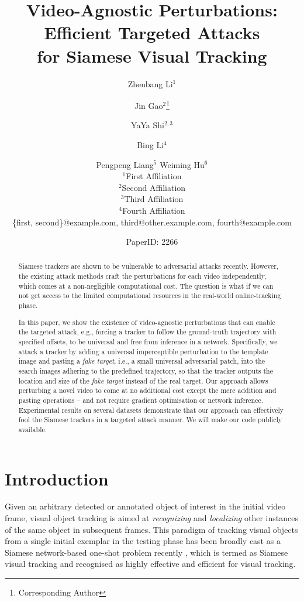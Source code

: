 \documentclass{article}
\title{Video-Agnostic Perturbations: Efficient Targeted Attacks \\ for Siamese Visual Tracking}
\author{
Zhenbang Li$^1$\and
Jin Gao$^2$\footnote{Corresponding Author}\and
YaYa Shi$^{2,3}$\and
Bing Li$^4$\and
Pengpeng Liang$^5$\And
Weiming Hu$^6$\\
\affiliations
$^1$First Affiliation\\
$^2$Second Affiliation\\
$^3$Third Affiliation\\
$^4$Fourth Affiliation\\
\emails
\{first, second\}@example.com,
third@other.example.com,
fourth@example.com
}
\author{PaperID: 2266}
\begin{document}
\maketitle

\begin{abstract}

Siamese trackers are shown to be vulnerable to adversarial attacks recently. However, the existing attack methods craft the perturbations for each video independently, which comes at a non-negligible computational cost. The question is what if we can not get access to the limited computational resources in the real-world online-tracking phase.

In this paper, we show the existence of video-agnostic perturbations that can enable the targeted attack, e.g., forcing a tracker to follow the ground-truth trajectory with specified offsets, to be universal and free from inference in a network. Specifically, we attack a tracker by adding a universal imperceptible perturbation to the template image and pasting a \textit{fake target}, i.e., a small universal adversarial patch, into the search images adhering to the predefined trajectory, so that the tracker outputs the location and size of the \textit{fake target} instead of the real target. Our approach allows perturbing a novel video to come at no additional cost except the mere addition and pasting operations -- and not require gradient optimisation or network inference. Experimental results on several datasets demonstrate that our approach can effectively fool the Siamese trackers in a targeted attack manner. We will make our code publicly available.

\end{abstract}

\section{Introduction}

Given an arbitrary detected or annotated object of interest in the initial video frame, visual object tracking is aimed at {\it recognizing} and {\it localizing} other instances of the same object in subsequent frames. This paradigm of tracking visual objects from a single initial exemplar in the testing phase has been broadly cast as a Siamese network-based one-shot problem recently \cite{SiamFC,SiamRPN,DaSiamRPN,SiamRPN++,SiamMask,SiamFC++}, which is termed as Siamese visual tracking and recognised as highly effective and efficient for visual tracking.
\end{document}
